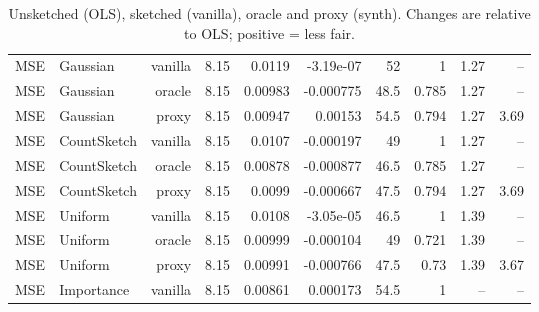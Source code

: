 \begin{table}[t]
\begin{tabular}{llrrrrrrrr}
\midrule
MSE & Gaussian & vanilla & 8.15 & 0.0119 & -3.19e-07 & 52 & 1 & 1.27 & -- \\
MSE & Gaussian & oracle & 8.15 & 0.00983 & -0.000775 & 48.5 & 0.785 & 1.27 & -- \\
MSE & Gaussian & proxy & 8.15 & 0.00947 & 0.00153 & 54.5 & 0.794 & 1.27 & 3.69 \\
MSE & CountSketch & vanilla & 8.15 & 0.0107 & -0.000197 & 49 & 1 & 1.27 & -- \\
MSE & CountSketch & oracle & 8.15 & 0.00878 & -0.000877 & 46.5 & 0.785 & 1.27 & -- \\
MSE & CountSketch & proxy & 8.15 & 0.0099 & -0.000667 & 47.5 & 0.794 & 1.27 & 3.69 \\
MSE & Uniform & vanilla & 8.15 & 0.0108 & -3.05e-05 & 46.5 & 1 & 1.39 & -- \\
MSE & Uniform & oracle & 8.15 & 0.00999 & -0.000104 & 49 & 0.721 & 1.39 & -- \\
MSE & Uniform & proxy & 8.15 & 0.00991 & -0.000766 & 47.5 & 0.73 & 1.39 & 3.67 \\
MSE & Importance & vanilla & 8.15 & 0.00861 & 0.000173 & 54.5 & 1 & -- & -- \\
\bottomrule
\end{tabular}
\caption{Unsketched (OLS), sketched (vanilla), oracle and proxy (synth). Changes are relative to OLS; positive = less fair.}
\label{tab:strat_synth}
\end{table}